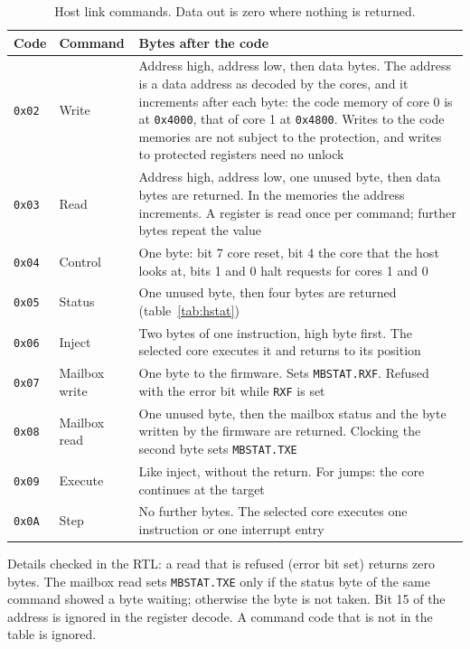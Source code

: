 \documentclass[10pt,a4paper]{article}
\newcommand{\reg}[1]{\texttt{#1}}
\begin{document}
\begin{table}[H]
\centering\small
\begin{tabularx}{\linewidth}{@{}llL@{}}
\toprule
Code & Command & Bytes after the code \\
\midrule
\texttt{0x02} & Write & Address high, address low, then data bytes. The address is a data address as decoded by the cores, and it increments after each byte: the code memory of core 0 is at \texttt{0x4000}, that of core 1 at \texttt{0x4800}. Writes to the code memories are not subject to the protection, and writes to protected registers need no unlock \\
\texttt{0x03} & Read & Address high, address low, one unused byte, then data bytes are returned. In the memories the address increments. A register is read once per command; further bytes repeat the value \\
\texttt{0x04} & Control & One byte: bit 7 core reset, bit 4 the core that the host looks at, bits 1 and 0 halt requests for cores 1 and 0 \\
\texttt{0x05} & Status & One unused byte, then four bytes are returned (table~\ref{tab:hstat}) \\
\texttt{0x06} & Inject & Two bytes of one instruction, high byte first. The selected core executes it and returns to its position \\
\texttt{0x07} & Mailbox write & One byte to the firmware. Sets \reg{MBSTAT.RXF}. Refused with the error bit while \reg{RXF} is set \\
\texttt{0x08} & Mailbox read & One unused byte, then the mailbox status and the byte written by the firmware are returned. Clocking the second byte sets \reg{MBSTAT.TXE} \\
\texttt{0x09} & Execute & Like inject, without the return. For jumps: the core continues at the target \\
\texttt{0x0A} & Step & No further bytes. The selected core executes one instruction or one interrupt entry \\
\bottomrule
\end{tabularx}
\caption{Host link commands. Data out is zero where nothing is returned.}
\end{table}

Details checked in the RTL: a read that is refused (error bit set) returns zero bytes. The mailbox read sets
\reg{MBSTAT.TXE} only if the status byte of the same command showed a byte waiting; otherwise the byte is not
taken. Bit 15 of the address is ignored in the register decode. A command code that is not in the table is ignored.
\end{document}
